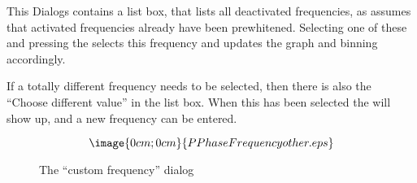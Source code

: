 This Dialogs contains a list box, that
lists all deactivated frequencies, as \period assumes
that activated frequencies already have been prewhitened.
Selecting one of these and pressing the  selects
this frequency and updates the graph and binning accordingly.

If a totally different frequency needs to be selected, then there is also
the ``Choose different value'' in the list box.
When this has been selected the 
will show up, and a new frequency can be entered.
\begin{figure}[h]
$$\image{0cm;0cm}{PPhaseFrequencyother.eps}$$%
\caption{The ``custom frequency'' dialog}%
\label{period.phase.frequency.other.dialog}
\end{figure}

